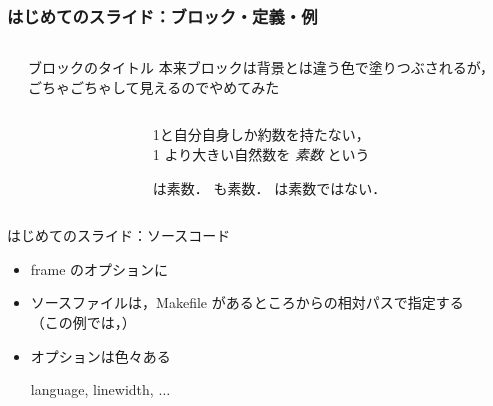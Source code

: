 \begin{frame}[fragile]
  \frametitle{はじめてのスライド：ブロック・定義・例}
  \begin{columns}
    \begin{column}{0.52\textwidth}
      
    \end{column}
    \begin{column}{0.48\textwidth}
      \begin{block}{ブロックのタイトル}
        本来ブロックは背景とは違う色で塗りつぶされるが，
        ごちゃごちゃして見えるのでやめてみた
      \end{block}
    \end{column}
  \end{columns}
  \begin{columns}
    \begin{column}{0.52\textwidth}
      
    \end{column}
    \begin{column}{0.48\textwidth}
      \begin{definition}
        1と自分自身しか約数を持たない，\\
        1 より大きい自然数を \emph{素数} という
      \end{definition}

      \begin{example}   
        \begin{itemize}
           は素数．
           も素数．
           は素数ではない．
        \end{itemize}
      \end{example}
    \end{column}
  \end{columns}
\end{frame}

\begin{frame}[fragile]{はじめてのスライド：ソースコード}
  
  \begin{itemize}
    \item
    frame のオプションに 
    \item
    ソースファイルは，Makefile があるところからの相対パスで指定する\\
    （この例では，\hbox{}）
    \item
    オプションは色々ある
    \begin{itemize}
      \egitem language, linewidth, $\dots$
    \end{itemize}
  \end{itemize}

\end{frame}

